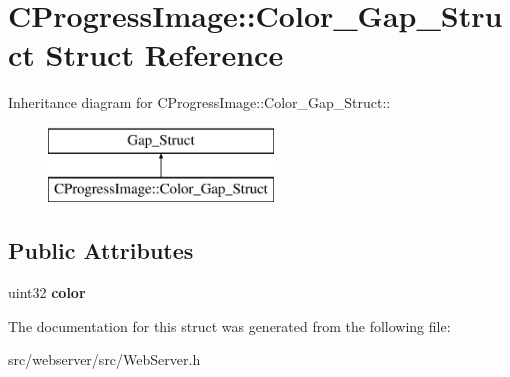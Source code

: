 \section{CProgressImage::Color\_\-Gap\_\-Struct Struct Reference}
\label{structCProgressImage_1_1Color__Gap__Struct}
Inheritance diagram for CProgressImage::Color\_\-Gap\_\-Struct::\begin{figure}[H]
\begin{center}
\leavevmode
\includegraphics[height=2cm]{structCProgressImage_1_1Color__Gap__Struct}
\end{center}
\end{figure}
\subsection*{Public Attributes}
\begin{DoxyCompactItemize}
\item 
uint32 {\bfseries color}\label{structCProgressImage_1_1Color__Gap__Struct_a1abf078281fcd5101e19e902262d0fac}

\end{DoxyCompactItemize}


The documentation for this struct was generated from the following file:\begin{DoxyCompactItemize}
\item 
src/webserver/src/WebServer.h\end{DoxyCompactItemize}
